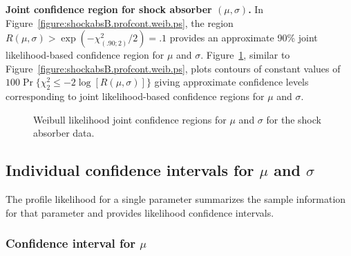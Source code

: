\begin{example}
{\bf Joint confidence region for shock absorber $(\mu,\sigma)$.}
\label{example:joint.conf.reg.sa}
In Figure~\ref{figure:shockabsB.profcont.weib.ps}, 
the region $R(\mu,\sigma) >
\exp(-\chi^{2}_{(.90;2)}/2)=.1$
provides an approximate
90\% joint likelihood-based confidence region for $\mu$ and $\sigma$.
Figure~\ref{figure:shockabsB.conlevcont.weib.ps}, 
similar to Figure~\ref{figure:shockabsB.profcont.weib.ps}, 
plots contours of constant
values of $100\Pr \{ \chi^{2}_{2} 
\leq -2 \log[ R (\mu, \sigma)] \}$ giving approximate confidence
levels corresponding to joint likelihood-based confidence regions for $\mu$
and $\sigma$.
\end{example}
\begin{figure}
\caption{Weibull likelihood joint confidence
regions for $\mu$ and $\sigma$ for the shock absorber data.}
\label{figure:shockabsB.conlevcont.weib.ps}
\end{figure}


\subsection{Individual confidence intervals for $\mu$ and $\sigma$}
\label{section:lr.ci.ls.par}
The profile likelihood for a single parameter summarizes the sample
information for that parameter and provides 
likelihood confidence intervals.

\subsubsection{Confidence interval for $\mu$}

